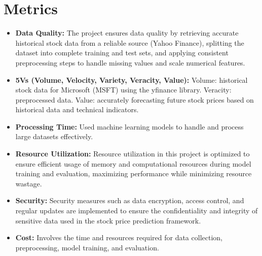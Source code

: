 \documentclass{article}
\begin{document}
\section{Metrics}
\begin{itemize}
    \item  {\bfseries Data Quality: }  The project ensures data quality by retrieving accurate historical stock data from a reliable source (Yahoo Finance), splitting the dataset into complete training and test sets, and applying consistent preprocessing steps to handle missing values and scale numerical features.
    \item {\bfseries 5Vs (Volume, Velocity, Variety, Veracity, Value):}  Volume: historical stock data for Microsoft (MSFT) using the yfinance library. Veracity:  preprocessed data. Value: accurately forecasting future stock prices based on historical data and technical indicators.

    \item {\bfseries Processing Time:} Used machine learning models to handle and process large datasets effectively.
    \item {\bfseries Resource Utilization: } Resource utilization in this project is optimized to ensure efficient usage of memory and computational resources during model training and evaluation, maximizing performance while minimizing resource wastage.
    \item {\bfseries Security: }  Security measures such as data encryption, access control, and regular updates are implemented to ensure the confidentiality and integrity of sensitive data used in the stock price prediction framework.
    \item {\bfseries  Cost:} Involves the time and resources required for data collection, preprocessing, model training, and evaluation.
\end{itemize}
\end{document}
